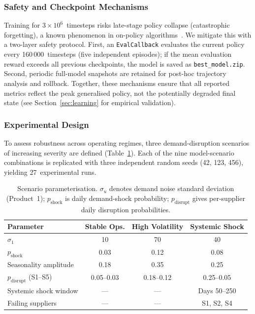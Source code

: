 \documentclass[preprint,12pt]{elsarticle}
\begin{document}
\subsubsection{Safety and Checkpoint Mechanisms}
\label{ssec:safety}
Training for $3\!\times\!10^{6}$~timesteps risks late-stage policy collapse (catastrophic forgetting), a known phenomenon in on-policy algorithms~\citep{Schulman_etal_2017}.
We mitigate this with a two-layer safety protocol.
First, an \texttt{EvalCallback} evaluates the current policy every 160\,000~timesteps (five independent episodes); if the mean evaluation reward exceeds all previous checkpoints, the model is saved as \texttt{best\_model.zip}.
Second, periodic full-model snapshots are retained for post-hoc trajectory analysis and rollback.
Together, these mechanisms ensure that all reported metrics reflect the peak generalised policy, not the potentially degraded final state (see Section~\ref{sec:learning} for empirical validation).

\subsubsection{Experimental Design}
\label{ssec:exp_design}
To assess robustness across operating regimes, three demand-disruption scenarios of increasing severity are defined (Table~\ref{tab:scenarios}). Each of the nine model-scenario combinations is replicated with three independent random seeds (42, 123, 456), yielding 27~experimental runs.

\begin{table}[ht]
\centering
\caption{Scenario parameterisation. $\sigma_u$ denotes demand noise standard deviation (Product~1); $p_{\text{shock}}$ is daily demand-shock probability; $p_{\text{disrupt}}$ gives per-supplier daily disruption probabilities.}
\label{tab:scenarios}
\small
\begin{tabular}{@{}lccc@{}}
\toprule
Parameter & Stable Ops. & High Volatility & Systemic Shock \\
\midrule
$\sigma_1$ & 10 & 70 & 40 \\
$p_{\text{shock}}$ & 0.03 & 0.12 & 0.08 \\
Seasonality amplitude & 0.18 & 0.35 & 0.25 \\
$p_{\text{disrupt}}$ (S1--S5) & 0.05--0.03 & 0.18--0.12 & 0.25--0.05 \\
Systemic shock window & --- & --- & Days 50--250 \\
Failing suppliers & --- & --- & S1, S2, S4 \\
\bottomrule
\end{tabular}
\end{table}
\end{document}
